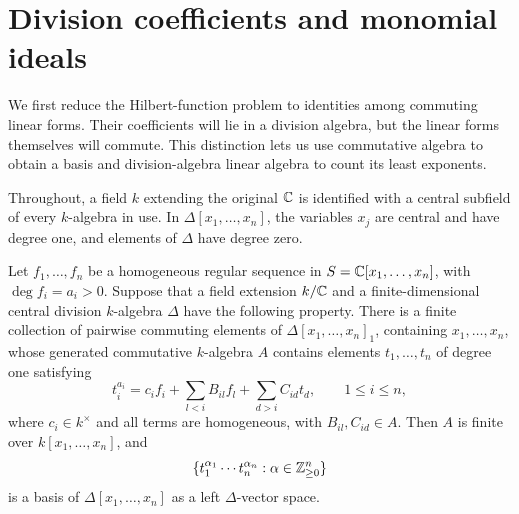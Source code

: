 \section{Division coefficients and monomial ideals}\label{sec:reduction}

We first reduce the Hilbert-function problem to identities among commuting
linear forms. Their coefficients will lie in a division algebra, but the
linear forms themselves will commute. This distinction lets us use
commutative algebra to obtain a basis and division-algebra linear algebra
to count its least exponents.

Throughout, a field \(k\) extending the original \(\mathbb C\) is identified with
a central subfield of every \(k\)-algebra in use. In
\(\Delta[x_1,\ldots,x_n]\), the variables \(x_j\) are central and have
degree one, and elements of \(\Delta\) have degree zero.

\begin{lemma}\label{lem:ordered-basis}
Let \(f_1,\ldots,f_n\) be a homogeneous regular sequence in
\(S=\mathbb C[x_1,\ldots,x_n]\), with \(\deg f_i=a_i>0\).
Suppose that a field extension \(k/\mathbb C\) and a finite-dimensional central
division \(k\)-algebra \(\Delta\) have the following property.
There is a finite collection of pairwise commuting elements of
\(\Delta[x_1,\ldots,x_n]_1\), containing \(x_1,\ldots,x_n\), whose
generated commutative \(k\)-algebra \(A\) contains elements
\(t_1,\ldots,t_n\) of degree one satisfying
\begin{equation}\label{eq:triangular}
 t_i^{a_i}
 =c_i f_i+\sum_{l<i}B_{il}f_l+\sum_{d>i}C_{id}t_d,
 \qquad 1\le i\le n,
\end{equation}
where \(c_i\in k^\times\) and all terms are homogeneous, with
\(B_{il},C_{id}\in A\).
Then \(A\) is finite over \(k[x_1,\ldots,x_n]\), and
\[
 \{t_1^{\alpha_1}\cdots t_n^{\alpha_n}:\alpha\in\mathbb Z_{\ge0}^n\}
\]
is a basis of \(\Delta[x_1,\ldots,x_n]\) as a left
\(\Delta\)-vector space.
\end{lemma}


